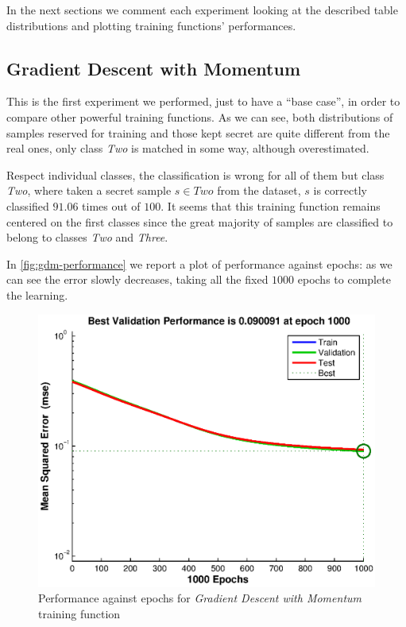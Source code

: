 \documentclass[10pt,a4paper]{article}
\begin{document}
    In the next sections we comment each experiment looking at the described table distributions
    and plotting training functions' performances.

    \subsection{Gradient Descent with Momentum}
    
    This is the first experiment we performed, just to have a ``base case'', in order to 
    compare other powerful training functions. As we can see, both distributions of samples
    reserved for training and those kept secret are quite different from the real ones, only
    class \emph{Two} is matched in some way, although overestimated.

    Respect individual classes, the classification is wrong for all of them but class \emph{Two}, 
    where taken a secret sample $s \in Two$ from the dataset, $s$ is correctly classified $91.06$ times out of $100$.
    It seems that this training function remains centered on the first classes since the
    great majority of samples are classified to belong to classes \emph{Two} and \emph{Three}.

    In \autoref{fig:gdm-performance} we report a plot of performance against epochs: as we can
    see the error slowly decreases, taking all the fixed $1000$ epochs to complete the learning.

    \begin{figure}
    \centering
    \includegraphics[scale=0.7]{eps/gradient-descent-performance.eps}
    \caption{Performance against epochs for \emph{Gradient Descent with Momentum} training function}
    \label{fig:gdm-performance}
    \end{figure}
\end{document}
